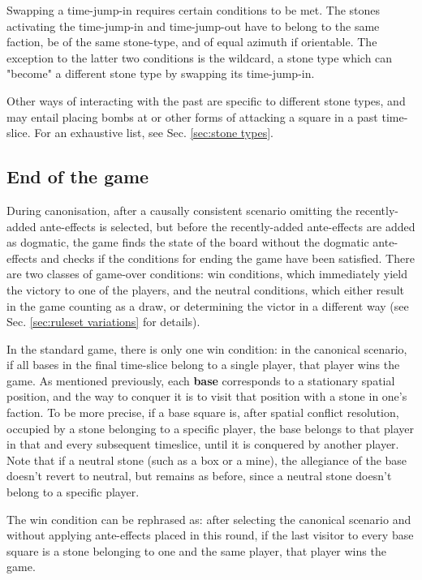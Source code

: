 \documentclass[12pt]{article}
\begin{document}
	Swapping a time-jump-in requires certain conditions to be met. The stones activating the time-jump-in and time-jump-out have to belong to the same faction, be of the same stone-type, and of equal azimuth if orientable. The exception to the latter two conditions is the wildcard, a stone type which can "become" a different stone type by swapping its time-jump-in.
	
	Other ways of interacting with the past are specific to different stone types, and may entail placing bombs at or other forms of attacking a square in a past time-slice. For an exhaustive list, see Sec. \ref{sec:stone types}.
	
	\subsection{End of the game}
	During canonisation, after a causally consistent scenario omitting the recently-added ante-effects is selected, but before the recently-added ante-effects are added as dogmatic, the game finds the state of the board without the dogmatic ante-effects and checks if the conditions for ending the game have been satisfied. There are two classes of game-over conditions: win conditions, which immediately yield the victory to one of the players, and the neutral conditions, which either result in the game counting as a draw, or determining the victor in a different way (see Sec. \ref{sec:ruleset variations} for details).
	
	In the standard game, there is only one win condition: in the canonical scenario, if all bases in the final time-slice belong to a single player, that player wins the game. As mentioned previously, each \textbf{base} corresponds to a stationary spatial position, and the way to conquer it is to visit that position with a stone in one's faction. To be more precise, if a base square is, after spatial conflict resolution, occupied by a stone belonging to a specific player, the base belongs to that player in that and every subsequent timeslice, until it is conquered by another player. Note that if a neutral stone (such as a box or a mine), the allegiance of the base doesn't revert to neutral, but remains as before, since a neutral stone doesn't belong to a specific player.
	
	The win condition can be rephrased as: after selecting the canonical scenario and without applying ante-effects placed in this round, if the last visitor to every base square is a stone belonging to one and the same player, that player wins the game.
	
\end{document}
